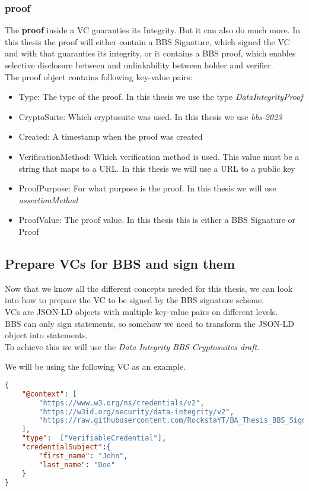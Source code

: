 \documentclass[
	a4paper               %
	,bibliography=totoc   %
	,listof=totoc         %
	,monolingual
]{bfhthesis}              %
\begin{document}
\subsubsection{proof}
The \textbf{proof} inside a VC guaranties its Integrity. But it can also do much more.
In this thesis the proof will either contain a BBS Signature, which signed the VC and with that guaranties its integrity, or it contains a BBS proof, which enables selective disclosure between and unlinkability between holder and verifier.\\
The proof object contains following key-value pairs:
\begin{itemize}
	\item Type: The type of the proof. In this thesis we use the type \textit{DataIntegrityProof}
	\item CryptoSuite: Which cryptosuite was used. In this thesis we use \textit{bbs-2023}
	\item Created: A timestamp when the proof was created
	\item VerificationMethod: Which verification method is used. This value must be a string that maps to a URL. In this thesis we will use a URL to a public key
	\item ProofPurpose: For what purpose is the proof. In this thesis we will use \textit{assertionMethod}
	\item ProofValue: The proof value. In this thesis this is either a BBS Signature or Proof
\end{itemize}

\subsection{Prepare VCs for BBS and sign them}
\label{sub:preparevc}
Now that we know all the different concepts needed for this thesis, we can look into how to prepare the VC to be signed by the BBS signature scheme.\\
VCs are JSON-LD objects with multiple key-value pairs on different levels.\\
BBS can only sign statements, so somehow we need to transform the JSON-LD object into statements.\\
To achieve this we will use the \textit{Data Integrity BBS Cryptosuites draft}\cite{bbsvc}.\newpage

We will be using the following VC as an example.
\begin{lstlisting}[language=json,firstnumber=1,caption={Example VC},captionpos=b]
{
	"@context": [
		"https://www.w3.org/ns/credentials/v2",
		"https://w3id.org/security/data-integrity/v2",
		"https://raw.githubusercontent.com/RockstaYT/BA_Thesis_BBS_Signatures/docs/context/example_1.jsonld"
	],
	"type":  ["VerifiableCredential"],
	"credentialSubject":{
		"first_name": "John",
		"last_name": "Doe"
	}
}
\end{lstlisting}
\end{document}
